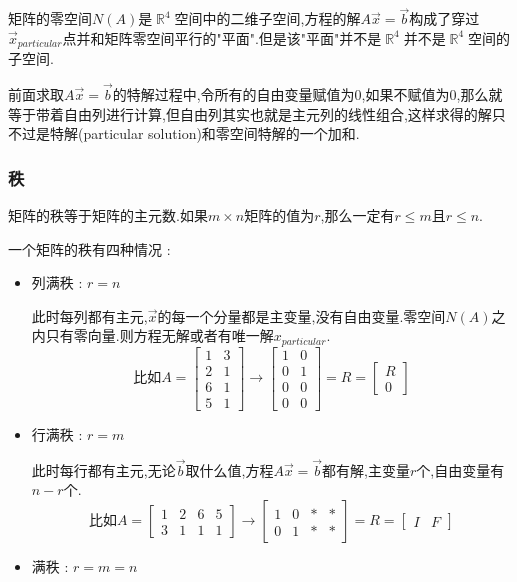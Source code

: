 \documentclass[UTF8,12pt]{ctexbook}
\DeclareMathOperator{\mathRealNumberCollection}{\mathbb{R}}
\begin{document}
{{{{{  矩阵的零空间$N(A)$是$\mathRealNumberCollection^4$空间中的二维子空间,方程的解$A\vec{x} = \vec{b}$构成了穿过$\vec{x}_{particular}$点并和矩阵零空间平行的"平面".但是该"平面"并不是$\mathRealNumberCollection^4$并不是$\mathRealNumberCollection^4$空间的子空间.

  前面求取$A\vec{x} = \vec{b}$的特解过程中,令所有的自由变量赋值为0,如果不赋值为0,那么就等于带着自由列进行计算,但自由列其实也就是主元列的线性组合,这样求得的解只不过是特解(particular solution)和零空间特解的一个加和.
}%

\subsubsection{秩}{
  矩阵的秩等于矩阵的主元数.如果$m \times n$矩阵的值为$r$,那么一定有$r \leq m$且$r \leq n$.

  一个矩阵的秩有四种情况 :
  \begin{itemize}
    \item {
          列满秩 : $r = n$

          此时每列都有主元,$\vec{x}$的每一个分量都是主变量,没有自由变量.零空间$N(A)$之内只有零向量.则方程无解或者有唯一解$x_{particular}$.
          $$
            \mbox{比如}A = \begin{bmatrix}
              1 & 3 \\
              2 & 1 \\
              6 & 1 \\
              5 & 1
            \end{bmatrix}
            \to
            \begin{bmatrix}
              1 & 0 \\
              0 & 1 \\
              0 & 0 \\
              0 & 0
            \end{bmatrix}
            =
            R
            =
            \begin{bmatrix}
              R \\
              0
            \end{bmatrix}
          $$
          }
    \item {
          行满秩 : $r = m$

          此时每行都有主元,无论$\vec{b}$取什么值,方程$A\vec{x} = \vec{b}$都有解,主变量$r$个,自由变量有$n - r$个.
          $$
            \mbox{比如}A = \begin{bmatrix}
              1 & 2 & 6 & 5 \\
              3 & 1 & 1 & 1
            \end{bmatrix}
            \to
            \begin{bmatrix}
              1 & 0 & * & * \\
              0 & 1 & * & *
            \end{bmatrix}
            =
            R
            =
            \begin{bmatrix}
              I & F
            \end{bmatrix}
          $$
          }
    \item {
          满秩 : $r = m = n$

}
\end{itemize}}}}}}
\end{document}
